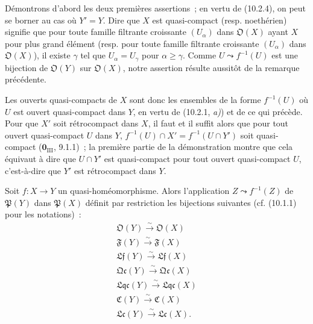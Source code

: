 Démontrons d'abord les deux premières assertions~; en vertu de (10.2.4), on
peut se borner au cas où $Y'=Y$. Dire que $X$ est quasi-compact (resp.
noethérien) signifie que pour toute famille filtrante croissante $(U_\alpha)$
dans $\mathfrak O(X)$ ayant $X$ pour plus grand élément (resp. pour toute
famille filtrante croissante $(U_\alpha)$ dans $\mathfrak O(X)$), il existe
$\gamma$ tel que $U_\alpha=U_\gamma$ pour $\alpha\geq\gamma$. Comme
$U\leadsto f^{-1}(U)$ est une bijection de $\mathfrak O(Y)$ sur
$\mathfrak O(X)$, notre assertion résulte aussitôt de la remarque précédente.

Les ouverts quasi-compacts de $X$ sont donc les ensembles de la forme
$f^{-1}(U)$ où $U$ est ouvert quasi-compact dans $Y$, en vertu de
(10.2.1, \emph{a)}) et de ce qui précède. Pour que $X'$ soit rétrocompact dans
$X$, il faut et il suffit alors que pour tout ouvert quasi-compact $U$ dans
$Y$, $f^{-1}(U)\cap X'=f^{-1}(U\cap Y')$ soit quasi-compact
($\mathbf 0_{\mathrm{III}}$, 9.1.1)~; la première partie de la démonstration
montre que cela équivaut à dire que $U\cap Y'$ est quasi-compact pour tout
ouvert quasi-compact $U$, c'est-à-dire que $Y'$ est rétrocompact dans $Y$.

\begin{proposition}[10.2.7]
\label{IV.10.2.7-fr}
Soit $f:X\to Y$ un quasi-homéomorphisme. Alors l'application
$Z\leadsto f^{-1}(Z)$ de $\mathfrak P(Y)$ dans $\mathfrak P(X)$ définit par
restriction les bijections suivantes \textup{(cf. (10.1.1) pour les notations)}~:
\[
\begin{gathered}
\mathfrak O(Y)\xrightarrow{\sim}\mathfrak O(X)\\
\mathfrak F(Y)\xrightarrow{\sim}\mathfrak F(X)\\
\mathfrak{Lf}(Y)\xrightarrow{\sim}\mathfrak{Lf}(X)\\
\mathfrak{Qc}(Y)\xrightarrow{\sim}\mathfrak{Qc}(X)\\
\mathfrak{Lqc}(Y)\xrightarrow{\sim}\mathfrak{Lqc}(X)\\
\mathfrak C(Y)\xrightarrow{\sim}\mathfrak C(X)\\
\mathfrak{Lc}(Y)\xrightarrow{\sim}\mathfrak{Lc}(X).
\end{gathered}
\]
\end{proposition}

